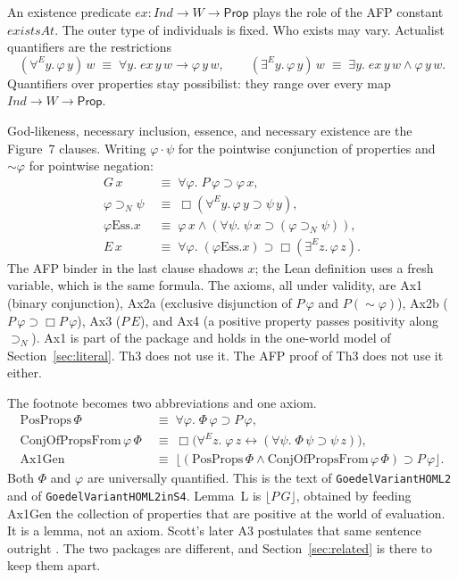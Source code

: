 \documentclass[11pt,a4paper]{article}
\newcommand{\valid}[1]{\lfloor #1 \rfloor}
\newcommand{\Nec}{\Box}
\newcommand{\exE}{\exists^{E}}
\newcommand{\allE}{\forall^{E}}
\newcommand{\necImp}{\supset_{N}}
\newcommand{\lean}[1]{\texttt{#1}}
\theoremstyle{definition}
\theoremstyle{remark}
\begin{document}
An existence predicate \(\mathit{ex} : \mathit{Ind} \to W \to \mathsf{Prop}\)
plays the role of the AFP constant \(\mathit{existsAt}\).
The outer type of individuals is fixed.
Who exists may vary.
Actualist quantifiers are the restrictions
\[
  (\allE y.\, \varphi\,y)\,w
    \;\equiv\; \forall y.\; \mathit{ex}\,y\,w \to \varphi\,y\,w,
  \qquad
  (\exE y.\, \varphi\,y)\,w
    \;\equiv\; \exists y.\; \mathit{ex}\,y\,w \land \varphi\,y\,w.
\]
Quantifiers over properties stay possibilist: they range over every map
\(\mathit{Ind} \to W \to \mathsf{Prop}\).

God-likeness, necessary inclusion, essence, and necessary existence are the
Figure~7 clauses.
Writing \(\varphi \mathbin{\cdot} \psi\) for the pointwise conjunction of
properties and \(\sim\varphi\) for pointwise negation:
\begin{align*}
  G\,x &\;\equiv\; \forall \varphi.\; P\,\varphi \supset \varphi\,x,\\
  \varphi \necImp \psi
    &\;\equiv\; \Nec(\allE y.\, \varphi\,y \supset \psi\,y),\\
  \varphi \mathbin{\mathrm{Ess.}} x
    &\;\equiv\; \varphi\,x \land
      (\forall \psi.\; \psi\,x \supset (\varphi \necImp \psi)),\\
  E\,x &\;\equiv\; \forall \varphi.\;
      (\varphi \mathbin{\mathrm{Ess.}} x) \supset \Nec(\exE z.\, \varphi\,z).
\end{align*}
The AFP binder in the last clause shadows \(x\); the Lean definition uses a
fresh variable, which is the same formula.
The axioms, all under validity, are Ax1 (binary conjunction), Ax2a (exclusive
disjunction of \(P\,\varphi\) and \(P(\sim\varphi)\)), Ax2b
(\(P\,\varphi \supset \Nec P\,\varphi\)), Ax3 (\(P\,E\)), and Ax4 (a positive
property passes positivity along \(\necImp\)).
Ax1 is part of the package and holds in the one-world model of
Section~\ref{sec:literal}.
Th3 does not use it.
The AFP proof of Th3 does not use it either.

The footnote becomes two abbreviations and one axiom.
\begin{align*}
  \mathrm{PosProps}\,\Phi
    &\;\equiv\; \forall \varphi.\; \Phi\,\varphi \supset P\,\varphi,\\
  \mathrm{ConjOfPropsFrom}\,\varphi\,\Phi
    &\;\equiv\; \Nec\bigl(\allE z.\;
        \varphi\,z \leftrightarrow
        (\forall \psi.\; \Phi\,\psi \supset \psi\,z)\bigr),\\
  \mathrm{Ax1Gen}
    &\;\equiv\; \valid{(\mathrm{PosProps}\,\Phi \land
        \mathrm{ConjOfPropsFrom}\,\varphi\,\Phi) \supset P\,\varphi}.
\end{align*}
Both \(\Phi\) and \(\varphi\) are universally quantified.
This is the text of \lean{GoedelVariantHOML2} and of
\lean{GoedelVariantHOML2inS4}.
Lemma~L is \(\valid{P\,G}\), obtained by feeding Ax1Gen the collection of
properties that are positive at the world of evaluation.
It is a lemma, not an axiom.
Scott's later A3 postulates that same sentence outright
\cite{scott2004notes}.
The two packages are different, and Section~\ref{sec:related} is there to keep
them apart.
\end{document}

